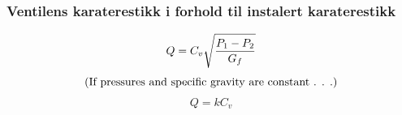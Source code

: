 \documentclass[aspectratio=169,xcolor=dvipsnames]{beamer}
\begin{document}
%
%
%
%
%
%
%
%
%
%
%
%
%
%
%
%
%
%
%
%
	\begin{frame}
		\frametitle{Ventilens karaterestikk i forhold til instalert karaterestikk}

$$Q = C_v \sqrt{{P_1 - P_2} \over G_f}$$
%
$$\hbox{(If pressures and specific gravity are constant . . .)}$$
%
$$Q = k C_v$$
	\end{frame}
\end{document}
